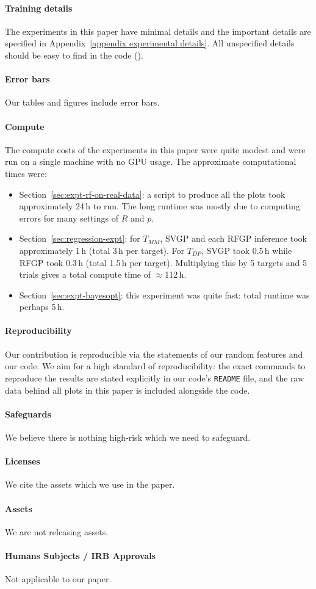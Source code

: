 \paragraph{Training details}
The experiments in this paper have minimal details and the important details are specified in Appendix~\ref{appendix experimental details}.
All unspecified details should be easy to find in the code (\codeURL{}).

\paragraph{Error bars} Our tables and figures include error bars.

\paragraph{Compute}
The compute costs of the experiments in this paper were quite modest
and were run on a single machine with no GPU usage.
The approximate computational times were:
\begin{itemize}
    \item Section~\ref{sec:expt-rf-on-real-data}: a script to produce all the plots took approximately 24\,h to run.
    The long runtime was mostly due to computing errors for many settings of $R$ and $p$.
    \item Section~\ref{sec:regression-expt}:
        for $T_{MM}$, SVGP and each RFGP inference took approximately 1\,h (total 3\,h per target).
        For $T_{DP}$, SVGP took 0.5\,h while RFGP took 0.3\,h (total 1.5\,h per target).
        Multiplying this by 5 targets and 5 trials gives a total compute time of $\approx$112\,h.
    \item Section~\ref{sec:expt-bayesopt}:
        this experiment was quite fast: total runtime was perhaps 5\,h.
\end{itemize}

\paragraph{Reproducibility}
Our contribution is reproducible via the statements of our random features
and our code.
We aim for a high standard of reproducibility:
the exact commands to reproduce the results are stated explicitly in our code's \texttt{README}
file,
and the raw data behind all plots in this paper is included alongside the code.

\paragraph{Safeguards}
We believe there is nothing high-risk which we need to safeguard.

\paragraph{Licenses}
We cite the assets which we use in the paper.

\paragraph{Assets}
We are not releasing assets.

\paragraph{Humans Subjects / IRB Approvals}
Not applicable to our paper.
